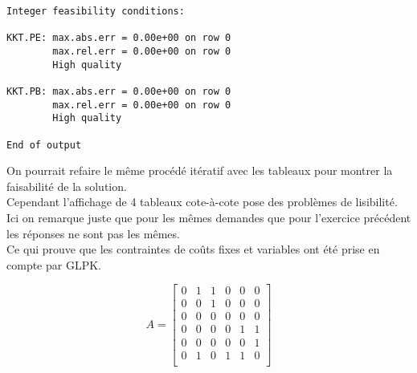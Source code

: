 \begin{lstlisting}
Integer feasibility conditions:

KKT.PE: max.abs.err = 0.00e+00 on row 0
        max.rel.err = 0.00e+00 on row 0
        High quality

KKT.PB: max.abs.err = 0.00e+00 on row 0
        max.rel.err = 0.00e+00 on row 0
        High quality

End of output
\end{lstlisting}

On pourrait refaire le même procédé itératif avec les tableaux pour montrer la faisabilité de la solution. \\
Cependant l'affichage de 4 tableaux cote-à-cote pose des problèmes de lisibilité. \\
Ici on remarque juste que pour les mêmes demandes que pour l'exercice précédent les réponses ne sont pas les mêmes. \\
Ce qui prouve que les contraintes de coûts fixes et variables ont été prise en compte par GLPK.

\[
A = \begin{bmatrix}
0 & 1 & 1 & 0 & 0 & 0 \\
0 & 0 & 1 & 0 & 0 & 0 \\
0 & 0 & 0 & 0 & 0 & 0 \\
0 & 0 & 0 & 0 & 1 & 1 \\
0 & 0 & 0 & 0 & 0 & 1 \\
0 & 1 & 0 & 1 & 1 & 0 \\
\end{bmatrix}
\]


